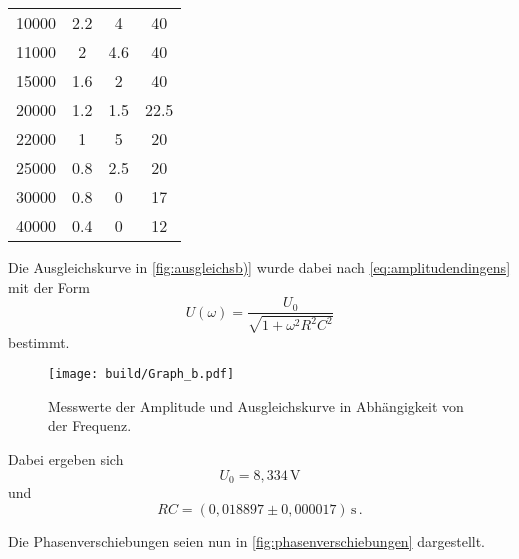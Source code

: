 \begin{table}[H]
\begin{tabular}{S S S S}
    10000       & 2.2                 & 4                   & 40         \\
    11000       & 2                   & 4.6                 & 40         \\
    15000       & 1.6                 & 2                   & 40         \\
    20000       & 1.2                 & 1.5                 & 22.5       \\
    22000       & 1                   & 5                   & 20         \\
    25000       & 0.8                 & 2.5                 & 20         \\
    30000       & 0.8                 & 0                   & 17         \\
    40000       & 0.4                 & 0                   & 12         \\
  \end{tabular}
\end{table}

Die Ausgleichskurve in \autoref{fig:ausgleichsb)} wurde dabei nach \eqref{eq:amplitudendingens} mit der Form
\begin{equation*}
  U(\omega) = \frac{U_0}{\sqrt{1 + \omega^2 R^2 C^2}}
\end{equation*}
bestimmt.

\begin{figure}[H]
  \centering
  \texttt{[image: build/Graph\_b.pdf]}
  \caption{Messwerte der Amplitude und Ausgleichskurve in Abhängigkeit von der Frequenz.}
  \label{fig:ausgleichsb)}
\end{figure}

Dabei ergeben sich 
\begin{equation*}
  U_0 = 8,334 \,\unit{\volt}
\end{equation*}
und
\begin{equation*}
  RC = (0,018897 \pm 0,000017) \,\unit{\second} \,.
\end{equation*}

Die Phasenverschiebungen seien nun in \autoref{fig:phasenverschiebungen} dargestellt.

